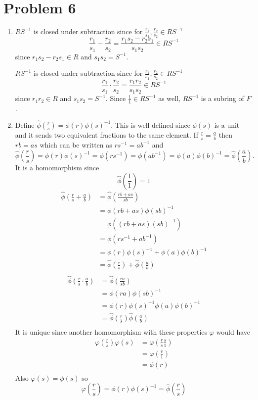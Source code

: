 \documentclass{article}
\begin{document}
\section*{Problem 6}
\begin{enumerate}
	\item $RS^{-1}$ is closed under subtraction since for $\frac{r_1}{s_1}, \frac{r_2}{s_2} \in RS^{-1}$
	\[
		\frac{r_1}{s_1} - \frac{r_2}{s_2} = \frac{r_1s_2 - r_2s_1}{s_1s_2} \in RS^{-1}
	\]
	since $r_1s_2 - r_2s_1 \in R$ and $s_1s_2 = S^{-1}$.

	$RS^{-1}$ is closed under subtraction since for $\frac{r_1}{s_1}, \frac{r_2}{s_2} \in RS^{-1}$
	\[
		\frac{r_1}{s_1}\cdot\frac{r_2}{s_2} = \frac{r_1r_2}{s_1s_2} \in RS^{-1}
	\]
	since $r_1r_2 \in R$ and $s_1s_2 = S^{-1}$.
	Since $\frac{1}{1} \in RS^{-1}$ as well, $RS^{-1}$ is a subring of $F$.
	\item Define $\hat{\phi}\left(\frac{r}{s}\right) = \phi(r)\phi(s)^{-1}$.
	This is well defined since $\phi(s)$ is a unit and 
	it sends two equivalent fractions to the same element.
	If $\frac{r}{s} = \frac{a}{b}$ then $rb = as$ which can be written as $rs^{-1} = ab^{-1}$ and 
	\[
		\hat{\phi}\left(\frac{r}{s}\right) 
		= \phi(r)\phi(s)^{-1} 
		= \phi(rs^{-1})
		= \phi(ab^{-1})
		= \phi(a)\phi(b)^{-1} 
		= \hat{\phi}\left(\frac{a}{b}\right).
	\]
	It is a homomorphism since 
	\[
		\hat{\phi}\left(\frac{1}{1}\right) = 1 
	\]
	\begin{align*}
		\hat{\phi}\left(\frac{r}{s} + \frac{a}{b}\right) &= \hat{\phi}\left(\frac{rb + as}{sb}\right) \\
		&= \phi(rb+as)\phi(sb)^{-1} \\
		&= \phi((rb+as)(sb)^{-1}) \\
		&= \phi(rs^{-1}+ab^{-1}) \\
		&= \phi(r)\phi(s)^{-1} + \phi(a)\phi(b)^{-1} \\
		&=\hat{\phi}\left(\frac{r}{s}\right) + \hat{\phi}\left(\frac{a}{b}\right) \\
	\end{align*}
	\begin{align*}
		\hat{\phi}\left(\frac{r}{s}\cdot\frac{a}{b}\right) &= \hat{\phi}\left(\frac{ra}{sb}\right) \\
		&= \phi(ra)\phi(sb)^{-1} \\
		&= \phi(r)\phi(s)^{-1}\phi(a)\phi(b)^{-1} \\
		&=\hat{\phi}\left(\frac{r}{s}\right)\hat{\phi}\left(\frac{a}{b}\right) \\
	\end{align*}
	It is unique since another homomorphism with these properties $\varphi$ would have 
	\begin{align*}
		\varphi(\frac{r}{s})\varphi(s) &= \varphi(\frac{r}{s}\frac{s}{1}) \\
		&= \varphi(\frac{r}{1}) \\
		&= \phi(r) \\
	\end{align*}
	Also $\varphi(s) = \phi(s)$ so 
	\[
		\varphi(\frac{r}{s}) = \phi(r) \phi(s)^{-1} = \hat{\phi}(\frac{r}{s})
	\]
\end{enumerate}
\newpage
\end{document}
